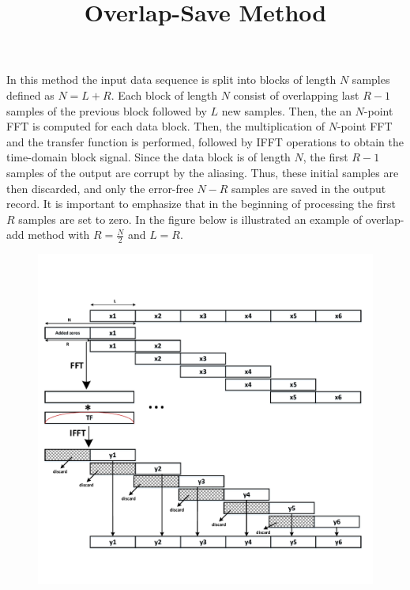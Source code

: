 \documentclass[a4paper]{article}
\title{Overlap-Save Method}
\author{ }
\date{ }
\begin{document}
\maketitle

In this method the input data sequence is split into blocks of length $N$ samples defined as $N=L+R$. Each block of length $N$ consist of overlapping last $R-1$ samples of the previous block followed by $L$ new samples. Then, the an $N$-point FFT is computed for each data block. Then, the multiplication of $N$-point FFT and the transfer function is performed, followed by IFFT operations to obtain the time-domain block signal. Since the data block is of length $N$, the first $R-1$ samples of the output are corrupt by the aliasing. Thus, these initial samples are then discarded, and only the error-free $N-R$ samples are saved in the output record.
It is important to emphasize that in the beginning of processing the first $R$ samples are set to zero.
In the figure below is illustrated an example of overlap-add method with $R=\frac{N}{2}$ and $L=R$.

\begin{figure}[h]
    \centering
    \includegraphics[width=15cm]{overlap-save}
\end{figure}
\end{document}

